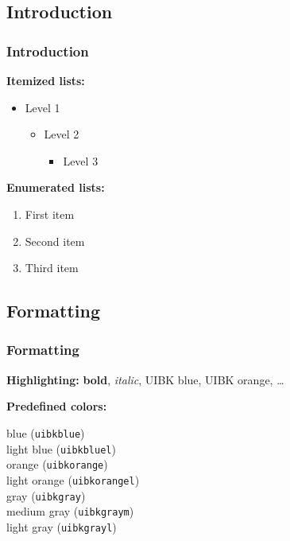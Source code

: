 \documentclass[11pt,t,usepdftitle=false,aspectratio=169]{beamer}
\begin{document}
\subsection{Introduction}


\begin{frame}
\frametitle{Introduction}

   
   \textbf{Itemized lists:}
   \begin{itemize}
      \item Level 1
      \begin{itemize}
         \item Level 2
         \begin{itemize}
            \item Level 3
         \end{itemize}
      \end{itemize}
   \end{itemize}

\bigskip

   \textbf{Enumerated lists:}
   \begin{enumerate}
      \item First item
      \item Second item
      \item Third item
   \end{enumerate}

\end{frame}


\subsection{Formatting}

\begin{frame}[fragile]
\frametitle{Formatting}

   \textbf{Highlighting:} \textbf{bold}, \textit{italic}, {\color{uibkblue} UIBK blue}, {\color{uibkorange} UIBK orange}, \dots

   \bigskip

   \textbf{Predefined colors:}

   \smallskip

    \quad blue (\verb|uibkblue|) \\[1mm]
    \quad light blue (\verb|uibkbluel|) \\[1mm]
    \quad orange (\verb|uibkorange|) \\[1mm]
    \quad light orange (\verb|uibkorangel|) \\[1mm]
    \quad gray (\verb|uibkgray|) \\[1mm]
    \quad medium gray (\verb|uibkgraym|) \\[1mm]
    \quad light gray (\verb|uibkgrayl|)

\end{frame}
\end{document}

